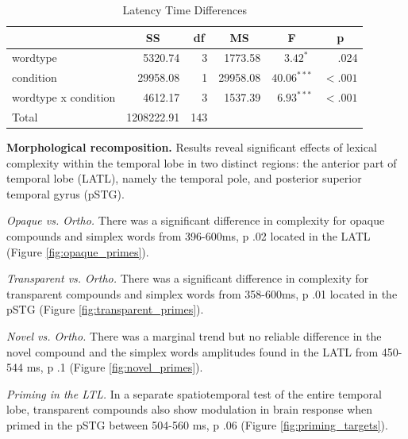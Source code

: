\documentclass{frontiersSCNS}
\begin{document}
\begin{table}
\begin{center}
\begin{tabular}{lrrrrr}
\toprule
& \multicolumn{1}{c}{\textbf{SS}} & \multicolumn{1}{c}{\textbf{df}} & \multicolumn{1}{c}{\textbf{MS}} & \multicolumn{1}{c}{\textbf{F}} & \multicolumn{1}{c}{\textbf{p}} \\
\midrule
wordtype & 5320.74 & 3 & 1773.58 & $3.42^{* \ \ }$ & .024 \\
condition & 29958.08 & 1 & 29958.08 & $40.06^{***}$ & $< .001$ \\
wordtype x condition & 4612.17 & 3 & 1537.39 & $6.93^{***}$ & $< .001$ \\
\midrule
Total & 1208222.91 & 143 \\
\bottomrule
\end{tabular}\caption{\label{tab:latency} Latency Time Differences}
\end{center}
\end{table}

\textbf{Morphological recomposition.} Results reveal significant effects of lexical complexity within the temporal lobe in two distinct regions: the anterior part of temporal lobe (LATL), namely the temporal pole, and posterior superior temporal gyrus (pSTG). 

\textit{Opaque vs. Ortho.} There was a significant difference in complexity for opaque compounds and simplex words from 396-600ms, p \lessthan .02 located in the LATL (Figure \ref{fig:opaque_primes}).  

\textit{Transparent vs. Ortho.} There was a significant difference in complexity for transparent compounds and simplex words from 358-600ms, p \lessthan .01 located in the pSTG (Figure \ref{fig:transparent_primes}).

\textit{Novel vs. Ortho.} There was a marginal trend but no reliable difference in the novel compound and the simplex words amplitudes found in the LATL from 450-544 ms, p \lessthan .1 (Figure \ref{fig:novel_primes}). 

\textit{Priming in the LTL.} In a separate spatiotemporal test of the entire temporal lobe, transparent compounds also show modulation in brain response when primed in the pSTG between 504-560 ms, p \lessthan .06 (Figure \ref{fig:priming_targets}).  
\end{document}
